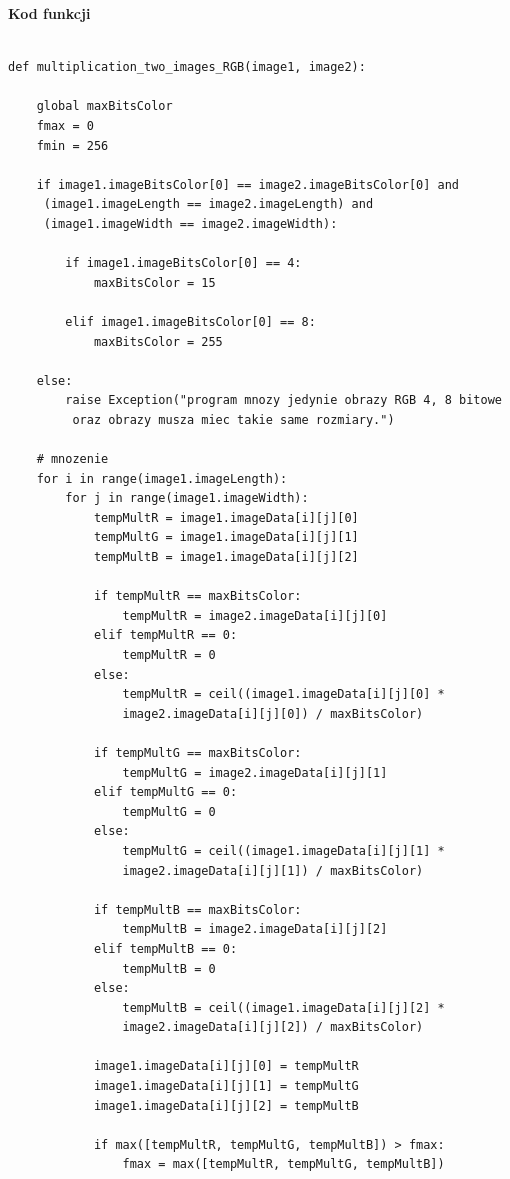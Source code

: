 \documentclass[magisterska,openany]{pracadypl}
\begin{document}
\newpage
\textbf{\Large Kod funkcji}
   
\lstset{language=Python}
\vspace{0.25cm}
\begin{lstlisting}[caption={Mnożenie dwóch obrazów}]

def multiplication_two_images_RGB(image1, image2):

    global maxBitsColor
    fmax = 0
    fmin = 256

    if image1.imageBitsColor[0] == image2.imageBitsColor[0] and
     (image1.imageLength == image2.imageLength) and 
     (image1.imageWidth == image2.imageWidth):

        if image1.imageBitsColor[0] == 4:
            maxBitsColor = 15

        elif image1.imageBitsColor[0] == 8:
            maxBitsColor = 255

    else:
        raise Exception("program mnozy jedynie obrazy RGB 4, 8 bitowe
         oraz obrazy musza miec takie same rozmiary.")

    # mnozenie
    for i in range(image1.imageLength):
        for j in range(image1.imageWidth):
            tempMultR = image1.imageData[i][j][0]
            tempMultG = image1.imageData[i][j][1]
            tempMultB = image1.imageData[i][j][2]

            if tempMultR == maxBitsColor:
                tempMultR = image2.imageData[i][j][0]
            elif tempMultR == 0:
                tempMultR = 0
            else:
                tempMultR = ceil((image1.imageData[i][j][0] * 
                image2.imageData[i][j][0]) / maxBitsColor)

            if tempMultG == maxBitsColor:
                tempMultG = image2.imageData[i][j][1]
            elif tempMultG == 0:
                tempMultG = 0
            else:
                tempMultG = ceil((image1.imageData[i][j][1] * 
                image2.imageData[i][j][1]) / maxBitsColor)

            if tempMultB == maxBitsColor:
                tempMultB = image2.imageData[i][j][2]
            elif tempMultB == 0:
                tempMultB = 0
            else:
                tempMultB = ceil((image1.imageData[i][j][2] * 
                image2.imageData[i][j][2]) / maxBitsColor)

            image1.imageData[i][j][0] = tempMultR
            image1.imageData[i][j][1] = tempMultG
            image1.imageData[i][j][2] = tempMultB

            if max([tempMultR, tempMultG, tempMultB]) > fmax:
                fmax = max([tempMultR, tempMultG, tempMultB])


\end{lstlisting}
\end{document}
